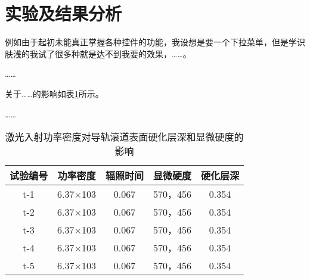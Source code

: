
\section{实验及结果分析}
例如由于起初未能真正掌握各种控件的功能，我设想是要一个下拉菜单，但是学识肤浅的我试了很多种就是达不到我要的效果，……。

……

关于……的影响如表\ref{data_table}所示。

……

\begin{table}[htbp]
        \small
        \newcommand{\tabincell}[2]{\begin{tabular}{@{}#1@{}}#2\end{tabular}}
        \centering
        \caption{激光入射功率密度对导轨滚道表面硬化层深和显微硬度的影响}
        \begin{tabular}{ccccc}
                \toprule
                试验编号 & 功率密度 & 辐照时间 & 显微硬度       & 硬化层深\\ \midrule
                t-1	&6.37×103	&0.067	&570，456	&0.354\\
                t-2	&6.37×103	&0.067	&570，456	&0.354\\
                t-3	&6.37×103	&0.067	&570，456	&0.354\\
                t-4	&6.37×103	&0.067	&570，456	&0.354\\
                t-5	&6.37×103	&0.067	&570，456	&0.354\\ \bottomrule
        \end{tabular}
        \label{data_table}
\end{table}
